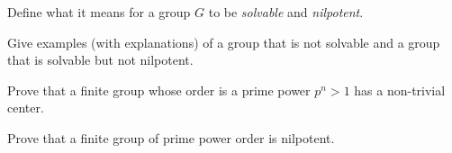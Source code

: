 \begin{alist}
\item Define what it means for a group $G$ to be \emph{solvable} and 
\emph{nilpotent}. 
\item Give examples (with explanations) of a group that is not solvable
and a group that is solvable but not nilpotent.
\item Prove that a finite group whose order is a prime power $p^n>1$ has a non-trivial center.
\item Prove that a finite group of prime power order is nilpotent.
\end{alist}
